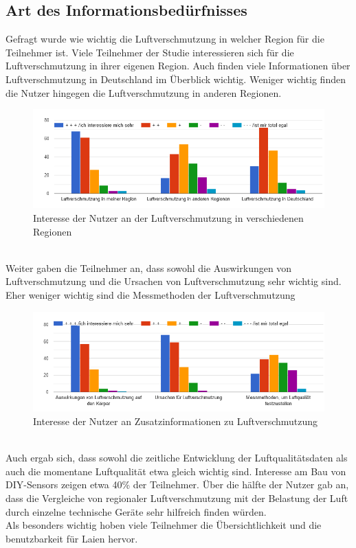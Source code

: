 \subsection{Art des Informationsbedürfnisses}
Gefragt wurde wie wichtig die Luftverschmutzung in welcher Region für die Teilnehmer ist.
Viele Teilnehmer der Studie interessieren sich für die Luftverschmutzung in ihrer eigenen Region. Auch finden viele Informationen über Luftverschmutzung in Deutschland im Überblick wichtig. Weniger wichtig finden die Nutzer hingegen die Luftverschmutzung in anderen Regionen.
\\
\begin{figure}[h]
    \centering
    \includegraphics[width=1\textwidth]{media/diagram/interesse.png}
    \caption{Interesse der Nutzer an der Luftverschmutzung in verschiedenen Regionen}
\end{figure}
\\
Weiter gaben die Teilnehmer an,  dass sowohl die Auswirkungen von Luftverschmutzung und die Ursachen von Luftverschmutzung sehr wichtig sind. Eher weniger wichtig sind die Messmethoden der Luftverschmutzung
\\
\begin{figure}[h]
    \centering
    \includegraphics[width=1\textwidth]{media/diagram/interesse2.png}
    \caption{Interesse der Nutzer an Zusatzinformationen zu Luftverschmutzung}
\end{figure}
\\
Auch ergab sich, dass sowohl die zeitliche Entwicklung der Luftqualitätsdaten als auch die momentane Luftqualität etwa gleich wichtig sind. Interesse am Bau von \gls{DIY}-\glspl{Sensor} zeigen etwa 40\%  der Teilnehmer.
Über die hälfte der Nutzer gab an, dass die Vergleiche von regionaler Luftverschmutzung mit der Belastung der Luft durch einzelne technische Geräte sehr hilfreich finden würden.
\\
Als besonders wichtig hoben viele Teilnehmer die Übersichtlichkeit und die benutzbarkeit für Laien hervor.


